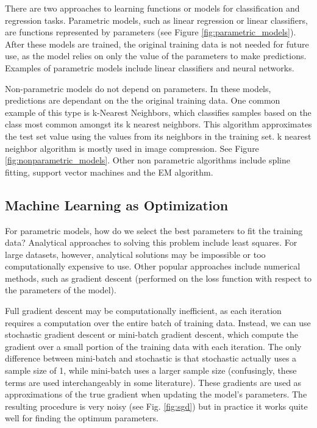 \documentclass[twoside]{article}
\begin{document}
There are two approaches to learning functions or models for classification and regression tasks. Parametric models, such as linear regression or linear classifiers, are functions represented by parameters (see Figure \ref{fig:parametric_models}). After these models are trained, the original training data is not needed for future use, as the model relies on only the value of the parameters to make predictions. Examples of parametric models include linear classifiers and neural networks. 

Non-parametric models do not depend on parameters. In these models, predictions are dependant on the the original training data. One common example of this type is k-Nearest Neighbors, which classifies samples based on the class most common amongst its k nearest neighbors. This algorithm approximates the test set value using the values from its neighbors in the training set. k nearest neighbor algorithm is mostly used in image compression. See Figure \ref{fig:nonparametric_models}. Other non parametric algorithms include spline fitting, support vector machines and the EM algorithm.


\subsection{Machine Learning as Optimization}

For parametric models, how do we select the best parameters to fit the training data? Analytical approaches to solving this problem include least squares. For large datasets, however, analytical solutions may be impossible or too computationally expensive to use. Other popular approaches include numerical methods, such as gradient descent (performed on the loss function with respect to the parameters of the model).

Full gradient descent may be computationally inefficient, as each iteration requires a computation over the entire batch of training data. Instead, we can use stochastic gradient descent or mini-batch gradient descent, which compute the gradient over a small portion of the training data with each iteration. The only difference between mini-batch and stochastic is that stochastic actually uses a sample size of 1, while mini-batch uses a larger sample size (confusingly, these terms are used interchangeably in some literature). These gradients are used as approximations of the true gradient when updating the model's parameters. The resulting procedure is very noisy (see Fig. \ref{fig:sgd}) but in practice it works quite well for finding the optimum parameters. 
\end{document}
